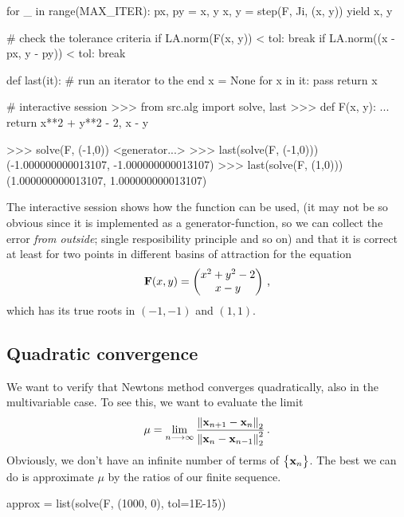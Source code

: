 \documentclass[12pt]{article}
\begin{document}
\begin{multicols*}{2}
\begin{python}[caption={Newton's method}]
    for _ in range(MAX_ITER):
        px, py = x, y
        x,  y  = step(F, Ji, (x, y))
        yield x, y

        # check the tolerance criteria
        if LA.norm(F(x, y)) < tol:
            break
        if LA.norm((x - px, y - py)) < tol:
            break

def last(it):
    # run an iterator to the end
    x = None
    for x in it: pass
    return x
    \end{python}
    \vspace{-0.5\baselineskip}
    \begin{python}[frame=b,numbers=none]
# interactive session
>>> from src.alg import solve, last
>>> def F(x, y):
...     return x**2 + y**2 - 2, x - y

>>> solve(F, (-1,0))
<generator...>
>>> last(solve(F, (-1,0)))
(-1.000000000013107, -1.000000000013107)
>>> last(solve(F, (1,0)))
(1.000000000013107, 1.000000000013107)
    \end{python}
    The interactive session shows how the function can be used,
    (it may not be so obvious since it is implemented
    as a generator-function, so we can collect the error {\em from outside};
    single resposibility principle and so on)
    and that it is correct at least for two points in different
    basins of attraction for the equation
    \[
        \vec F(x, y) = \begin{pmatrix}
            x^2 + y^2 - 2 \\
            x - y
        \end{pmatrix} \,\text,
    \]
    which has its true roots in $(-1, -1)$ and $(1, 1)$.

    \subsection*{Quadratic convergence}
    We want to verify that Newtons method converges quadratically,
    also in the multivariable case.
    To see this, we want to evaluate the limit
    \[
        \mu = \lim_{n \longrightarrow \infty}
            \frac{\Norm[2]{\vec x_{n+1} - \vec x_n}}
                 {\Norm[2]{\vec x_n - \vec x_{n-1}}^2}
        \,\text.
    \]
    Obviously, we don't have an infinite number of terms of $\Seq{\vec x_n}$.
    The best we can do is approximate $\mu$ by the ratios of our finite sequence.
    \begin{python}[
        caption={Computing the sequence of ratios}
    ]
approx = list(solve(F, (1000, 0), tol=1E-15))


\end{python}
\end{multicols*}
\end{document}
